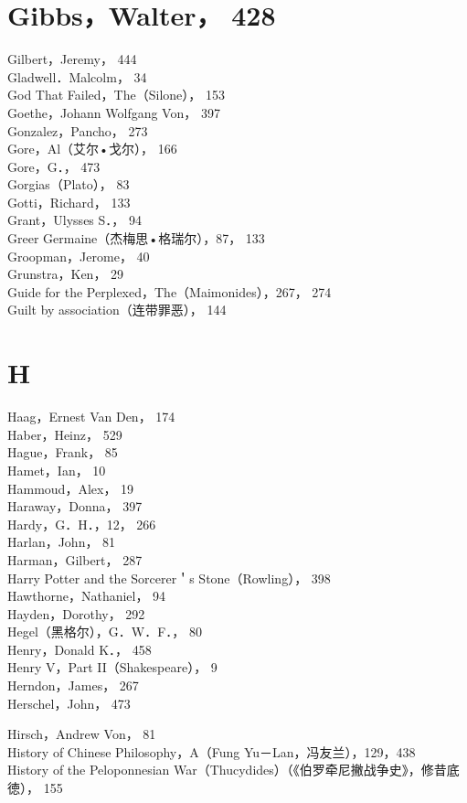 \section*{Gibbs，Walter， 428}
Gilbert，Jeremy， 444\\
Gladwell．Malcolm， 34\\
God That Failed，The（Silone）， 153\\
Goethe，Johann Wolfgang Von， 397\\
Gonzalez，Pancho， 273\\
Gore，Al（艾尔•戈尔）， 166\\
Gore，G．， 473\\
Gorgias（Plato）， 83\\
Gotti，Richard， 133\\
Grant，Ulysses S．， 94\\
Greer Germaine（杰梅思•格瑞尔），87， 133\\
Groopman，Jerome， 40\\
Grunstra，Ken， 29\\
Guide for the Perplexed，The（Maimonides），267， 274\\
Guilt by association（连带罪恶）， 144

\section*{H}
Haag，Ernest Van Den， 174\\
Haber，Heinz， 529\\
Hague，Frank， 85\\
Hamet，Ian， 10\\
Hammoud，Alex， 19\\
Haraway，Donna， 397\\
Hardy，G．H．，12， 266\\
Harlan，John， 81\\
Harman，Gilbert， 287\\
Harry Potter and the Sorcerer＇s Stone（Rowling）， 398\\
Hawthorne，Nathaniel， 94\\
Hayden，Dorothy， 292\\
Hegel（黑格尔），G．W．F．， 80\\
Henry，Donald K．， 458\\
Henry V，Part II（Shakespeare）， 9\\
Herndon，James， 267\\
Herschel，John， 473

Hirsch，Andrew Von， 81\\
History of Chinese Philosophy，A（Fung Yu－Lan，冯友兰），129，438\\
History of the Peloponnesian War（Thucydides）（《伯罗牵尼撇战争史》，修昔底徳）， 155

